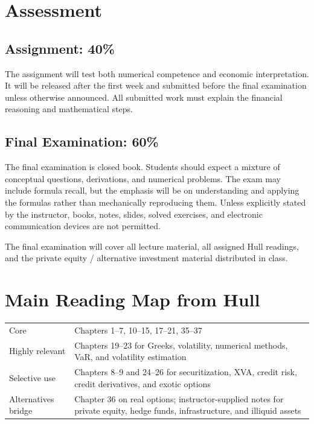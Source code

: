 \documentclass[11pt]{article}
\begin{document}
\section*{Assessment}

\subsection*{Assignment: 40\%}

The assignment will test both numerical competence and economic interpretation. It will be released after the first week and submitted before the final examination unless otherwise announced. All submitted work must explain the financial reasoning and mathematical steps.


\subsection*{Final Examination: 60\%}

The final examination is closed book. Students should expect a mixture of conceptual questions, derivations, and numerical problems. The exam may include formula recall, but the emphasis will be on understanding and applying the formulas rather than mechanically reproducing them. Unless explicitly stated by the instructor, books, notes, slides, solved exercises, and electronic communication devices are not permitted.

The final examination will cover all lecture material, all assigned Hull readings, and the private equity / alternative investment material distributed in class.

\section*{Main Reading Map from Hull}

\begin{tabular}{@{}p{}p{}@{}}
\toprule
Core & Chapters 1--7, 10--15, 17--21, 35--37 \\
Highly relevant & Chapters 19--23 for Greeks, volatility, numerical methods, VaR, and volatility estimation \\
Selective use & Chapters 8--9 and 24--26 for securitization, XVA, credit risk, credit derivatives, and exotic options \\
Alternatives bridge & Chapter 36 on real options; instructor-supplied notes for private equity, hedge funds, infrastructure, and illiquid assets \\
\bottomrule
\end{tabular}
\end{document}
